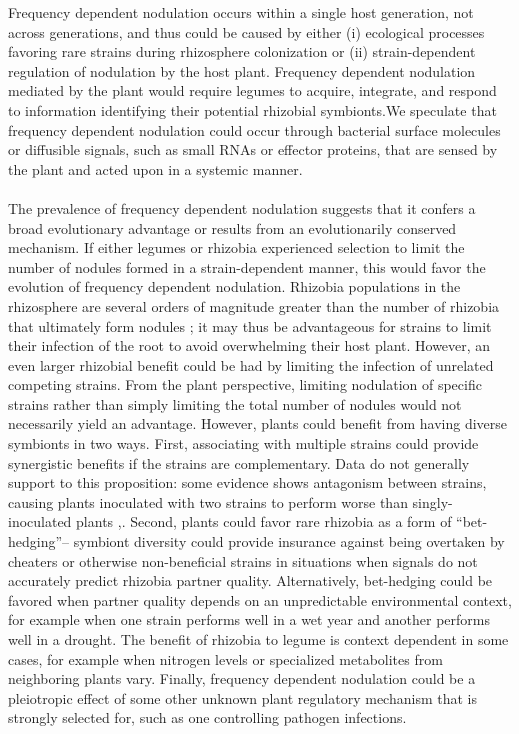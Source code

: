 \documentclass[12pt]{article}
\begin{document}
\begin{doublespace}
Frequency dependent nodulation occurs within a single host generation, not across generations, and thus could be caused by either (i) ecological processes favoring rare strains during rhizosphere colonization or (ii) strain-dependent regulation of nodulation by the host plant. Frequency dependent nodulation mediated by the plant would require legumes to acquire, integrate, and respond to information identifying their potential rhizobial symbionts.We speculate that frequency dependent nodulation could occur through bacterial surface molecules or diffusible signals, such as small RNAs or effector proteins, that are sensed by the plant and acted upon in a systemic manner. 

\paragraph{}%
The prevalence of frequency dependent nodulation suggests that it confers a broad evolutionary advantage or results from an evolutionarily conserved mechanism. If either legumes or rhizobia experienced selection to limit the number of nodules formed in a strain-dependent manner, this would favor the evolution of frequency dependent nodulation. Rhizobia populations in the rhizosphere are several orders of magnitude greater than the number of rhizobia that ultimately form nodules \cite{Denison2000}; it may thus be advantageous for strains to limit their infection of the root to avoid overwhelming their host plant. However, an even larger rhizobial benefit could be had by limiting the infection of unrelated competing strains. From the plant perspective, limiting nodulation of specific strains rather than simply limiting the total number of nodules would not necessarily yield an advantage. However, plants could benefit from having diverse symbionts in two ways. First, associating with multiple strains could provide synergistic benefits if the strains are complementary. Data do not generally support to this proposition: some evidence shows antagonism between strains, causing plants inoculated with two strains to perform worse than singly-inoculated plants \cite{Heath2007},\cite{Barrett2015}. Second, plants could favor rare rhizobia as a form of “bet-hedging”-- symbiont diversity could provide insurance against being overtaken by cheaters or otherwise non-beneficial strains in situations when signals do not accurately predict rhizobia partner quality. Alternatively, bet-hedging could be favored when partner quality depends on an unpredictable environmental context, for example when one strain performs well in a wet year and another performs well in a drought. The benefit of rhizobia to legume is context dependent in some cases, for example when nitrogen levels \cite{Heath2007} or specialized metabolites from neighboring plants \cite{Ehlers2012} vary. Finally, frequency dependent nodulation could be a pleiotropic effect of some other unknown plant regulatory mechanism that is strongly selected for, such as one controlling pathogen infections.


\end{doublespace}
\end{document}
